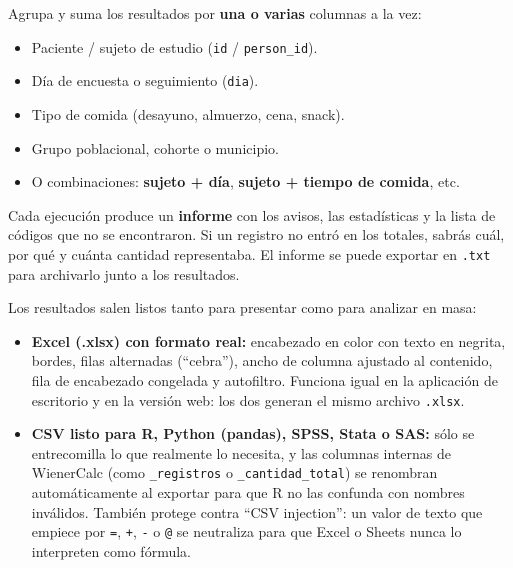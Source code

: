 \documentclass[11pt,a4paper]{article}
\begin{document}
\vspace{0.3cm}

\begin{glassbox}
Agrupa y suma los resultados por \textbf{una o varias} columnas a la vez:
\begin{itemize}[label=\textcolor{aeroemerald}{$\checkmark$}]
    \item Paciente / sujeto de estudio (\texttt{id} / \texttt{person\_id}).
    \item Día de encuesta o seguimiento (\texttt{dia}).
    \item Tipo de comida (desayuno, almuerzo, cena, snack).
    \item Grupo poblacional, cohorte o municipio.
    \item O combinaciones: \textbf{sujeto + día}, \textbf{sujeto + tiempo de comida}, etc.
\end{itemize}
\end{glassbox}

\vspace{0.3cm}

\begin{glassbox}
Cada ejecución produce un \textbf{informe} con los avisos, las estadísticas y la lista de códigos que no se encontraron. Si un registro no entró en los totales, sabrás cuál, por qué y cuánta cantidad representaba. El informe se puede exportar en \texttt{.txt} para archivarlo junto a los resultados.
\end{glassbox}

\vspace{0.3cm}

\begin{glassbox}
Los resultados salen listos tanto para presentar como para analizar en masa:
\begin{itemize}[label=\textcolor{aeroemerald}{$\checkmark$}]
    \item \textbf{Excel (.xlsx) con formato real:} encabezado en color con texto en negrita, bordes, filas alternadas (``cebra''), ancho de columna ajustado al contenido, fila de encabezado congelada y autofiltro. Funciona igual en la aplicación de escritorio y en la versión web: los dos generan el mismo archivo \texttt{.xlsx}.
    \item \textbf{CSV listo para R, Python (pandas), SPSS, Stata o SAS:} sólo se entrecomilla lo que realmente lo necesita, y las columnas internas de WienerCalc (como \texttt{\_registros} o \texttt{\_cantidad\_total}) se renombran automáticamente al exportar para que R no las confunda con nombres inválidos. También protege contra ``CSV injection'': un valor de texto que empiece por \texttt{=}, \texttt{+}, \texttt{-} o \texttt{@} se neutraliza para que Excel o Sheets nunca lo interpreten como fórmula.
\end{itemize}
\end{glassbox}
\end{document}
